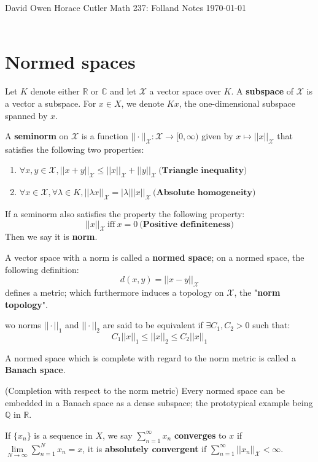 \documentclass[12pt]{article}
\newcommand{\R}{\mathbb{R}}
\newcommand{\C}{\mathbb{C}}
\newcommand{\Q}{\mathbb{Q}}
\newcommand{\X}{\mathcal{X}}
\newenvironment{definition}[2][Definition]{\begin{trivlist}
\item[\hskip \labelsep {\bfseries #1}\hskip \labelsep {\bfseries #2.}]}{\end{trivlist}}
\newenvironment{example}[1][Example]{\begin{trivlist}
\item[\hskip \labelsep {\bfseries #1:}]}{\end{trivlist}}
\begin{document}
\noindent David Owen Horace Cutler \hfill {\Large Math 237: Folland Notes} \hfill \today
\\ \\
\section{Normed spaces}
Let $K$ denote either $\R$ or $\C$ and let $\X$ a vector space over $K$. A \textbf{subspace} of $\X$ is a vector a subspace. For $x \in X$, we denote $Kx$, the one-dimensional subspace spanned by $x$.
\begin{definition}{(Seminorm and Norm)}
    A \textbf{seminorm} on $\X$ is a function $||\cdot||_\X : \X \rightarrow [0,\infty)$ given by $x \mapsto ||x||_\X$ that satisfies the following two properties:
    \begin{enumerate}
        \item $\forall x,y \in \X, ||x + y||_\X \leq ||x||_\X + ||y||_\X \: \textbf{(Triangle inequality)}$
        \item $\forall x \in \X, \forall \lambda \in K, ||\lambda x||_\X = |\lambda|||x||_\X \: \textbf{(Absolute homogeneity)}$
    \end{enumerate}
    If a seminorm also satisfies the property the following property:
    $$||x||_\X \: \text{iff} \: x = 0 \: \textbf{(Positive definiteness)}$$
    Then we say it is \textbf{norm}.
\end{definition}

A vector space with a norm is called a \textbf{normed space}; on a normed space, the following definition:
$$d(x,y) = ||x - y||_\X$$
defines a metric; which furthermore induces a topology on $\X$, the "\textbf{norm topology}". 

\begin{definition}
    Two norms $||\cdot||_1$ and $||\cdot||_2$ are said to be equivalent if $\exists C_1, C_2 > 0$ such that:
    $$C_1||x||_1 \leq ||x||_2 \leq C_2||x||_1$$
\end{definition}

A normed space which is complete with regard to the norm metric is called a \textbf{Banach space}. 

\begin{example}{(Completion with respect to the norm metric)}
    Every normed space can be embedded in a Banach space as a dense subspace; the prototypical example being $\Q$ in $\R$. 
\end{example}

\begin{definition}{(Convergent vs. absolutely convergent)}
    If $\{x_n\}$ is a sequence in $X$, we say $\sum_{n = 1}^{\infty} x_n$ \textbf{converges} to $x$ if $\underset{N \rightarrow \infty}{\lim} \sum_{n = 1}^N x_n = x$, it is \textbf{absolutely convergent} if $\sum_{n = 1}^\infty ||x_n||_\X < \infty$. 
\end{definition}
\end{document}
